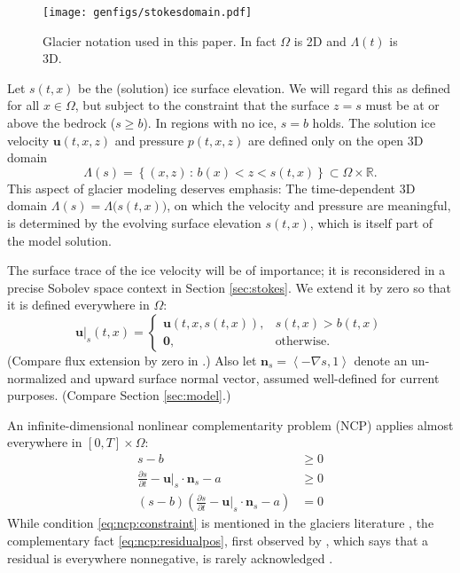 \documentclass[hidelinks,onefignum,onetabnum,final]{siamart220329}  %
\newcommand{\RR}{\mathbb{R}}
\newcommand{\grad}{\nabla}
\newcommand{\bn}{\mathbf{n}}
\newcommand{\bu}{\mathbf{u}}
\newcommand{\bzero}{\bm{0}}
\begin{document}
\begin{figure}[ht]
\centering
\texttt{[image: genfigs/stokesdomain.pdf]}
\caption{Glacier notation used in this paper.  In fact $\Omega$ is 2D and $\Lambda(t)$ is 3D.}
\label{fig:stokesdomain}
\end{figure}

Let $s(t,x)$ be the (solution) ice surface elevation.  We will regard this as defined for all $x\in\Omega$, but subject to the constraint that the surface $z=s$ must be at or above the bedrock ($s \ge b$).  In regions with no ice, $s=b$ holds.  The solution ice velocity $\bu(t,x,z)$ and pressure $p(t,x,z)$ are defined only on the open 3D domain
\begin{equation}
\Lambda(s) = \left\{(x,z)\,:\,b(x) < z < s(t,x)\right\} \subset \Omega \times \RR. \label{eq:icydomain}
\end{equation}
This aspect of glacier modeling deserves emphasis:  The time-dependent 3D domain $\Lambda(s)=\Lambda\big(s(t,x)\big)$, on which the velocity and pressure are meaningful, is determined by the evolving surface elevation $s(t,x)$, which is itself part of the model solution.

The surface trace of the ice velocity will be of importance; it is reconsidered in a precise Sobolev space context in Section \ref{sec:stokes}.  We extend it by zero so that it is defined everywhere in $\Omega$:
\begin{equation}
\bu|_s(t,x) = \begin{cases} \bu(t,x,s(t,x)), & s(t,x)>b(t,x) \\
                            \bzero, & \text{otherwise} .\end{cases} \label{eq:defineus}
\end{equation}
(Compare flux extension by zero in \cite{SchoofHewitt2013}.)  Also let $\bn_s = \left<-\grad s,1\right>$ denote an un-normalized and upward surface normal vector, assumed well-defined for current purposes.  (Compare Section \ref{sec:model}.)

An infinite-dimensional nonlinear complementarity problem (NCP) \cite{Bueler2021conservation,FacchineiPang2003,SchoofHewitt2013} applies almost everywhere in $[0,T]\times \Omega$:
\begin{subequations}
\label{eq:ncp}
\begin{align}
s - b &\ge 0 \label{eq:ncp:constraint} \\
\frac{\partial s}{\partial t} - \bu|_s \cdot \bn_s - a &\ge 0 \label{eq:ncp:residualpos} \\
(s - b) \left(\frac{\partial s}{\partial t} - \bu|_s \cdot \bn_s - a\right) &= 0
\end{align}
\end{subequations}
While condition \eqref{eq:ncp:constraint} is mentioned in the glaciers literature \cite{Durandetal2009,Halfar1981,JouvetBueler2012,PiersantiTemam2023,WirbelJarosch2020}, the complementary fact \eqref{eq:ncp:residualpos}, first observed by \cite{Calvoetal2003}, which says that a residual is everywhere nonnegative, is rarely acknowledged \cite{SchoofHewitt2013}.
\end{document}
